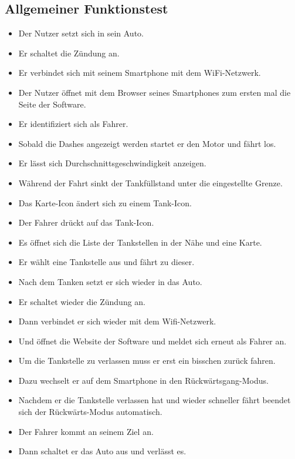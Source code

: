 \documentclass[pflichtenheft.tex]{subfiles}
\begin{document}
\subsection{Allgemeiner Funktionstest}
\begin{itemize}
\item Der Nutzer setzt sich in sein Auto.
\item Er schaltet die Zündung an.
\item Er verbindet sich mit seinem Smartphone mit dem WiFi-Netzwerk.
\item Der Nutzer öffnet mit dem Browser seines Smartphones zum ersten mal die Seite der Software.
\item Er identifiziert sich als Fahrer.
\item Sobald die Dashes angezeigt werden startet er den Motor und fährt los.
\item Er lässt sich Durchschnittsgeschwindigkeit anzeigen.
\item Während der Fahrt sinkt der Tankfüllstand unter die eingestellte Grenze.
\item Das Karte-Icon ändert sich zu einem Tank-Icon.
\item Der Fahrer drückt auf das Tank-Icon.
\item Es öffnet sich die Liste der Tankstellen in der Nähe und eine Karte.
\item Er wählt eine Tankstelle aus und fährt zu dieser.
\item Nach dem Tanken setzt er sich wieder in das Auto.
\item Er schaltet wieder die Zündung an.
\item Dann verbindet er sich wieder mit dem Wifi-Netzwerk.
\item Und öffnet die Website der Software und meldet sich erneut als Fahrer an.
\item Um die Tankstelle zu verlassen muss er erst ein bisschen zurück fahren.
\item Dazu wechselt er auf dem Smartphone in den Rückwärtsgang-Modus.
\item Nachdem er die Tankstelle verlassen hat und wieder schneller fährt beendet sich der Rückwärts-Modus automatisch.
\item Der Fahrer kommt an seinem Ziel an.
\item Dann schaltet er das Auto aus und verlässt es.
\end{itemize}
\end{document}
